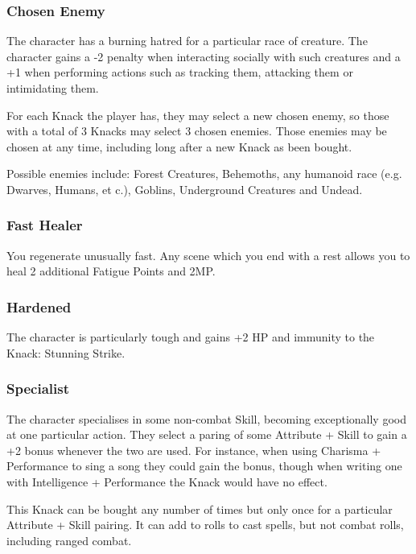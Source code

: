 \documentclass[titlepage,a4paper,openany]{book}
\begin{document}
\begin{multicols}{2}

\subsubsection{Chosen Enemy}

The character has a burning hatred for a particular race of creature. The character gains a -2 penalty when interacting socially with such creatures and a +1 when performing actions such as tracking them, attacking them or intimidating them.

For each Knack the player has, they may select a new chosen enemy, so those with a total of 3 Knacks may select 3 chosen enemies. Those enemies may be chosen at any time, including long after a new Knack as been bought.

Possible enemies include: Forest Creatures, Behemoths, any humanoid race (e.g. Dwarves, Humans, et c.), Goblins, Underground Creatures and Undead.

\subsubsection{Fast Healer}

You regenerate unusually fast. Any scene which you end with a rest allows you to heal 2 additional Fatigue Points and 2MP.

\subsubsection{Hardened}

The character is particularly tough and gains +2 HP and immunity to the Knack: Stunning Strike.

\subsubsection{Specialist}

The character specialises in some non-combat Skill, becoming exceptionally good at one particular action. They select a paring of some Attribute + Skill to gain a +2 bonus whenever the two are used. For instance, when using Charisma + Performance to sing a song they could gain the bonus, though when writing one with Intelligence + Performance the Knack would have no effect.

This Knack can be bought any number of times but only once for a particular Attribute + Skill pairing. It can add to rolls to cast spells, but not combat rolls, including ranged combat.

\end{multicols}
\end{document}
